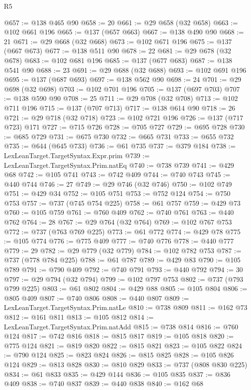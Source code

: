 \begin{lexlean}{R5}
\begin{coremodule}
{{{{{{{{{{{{{{{{{{{{{{{{{{{{{{{{{{{{{{{{{{{{{{{{{{{{{{{{{{{{{{{{{{{{{{{{{{{{{{{{{{{{@657 := @138 @465 @90
@658 := 20
@661 := @29 @658 (@32 @658)
@663 := @102 @661 @196
@665 := @137 (@657 @663)
@667 := @138 @490 @90
@668 := 21
@671 := @29 @668 (@32 @668)
@673 := @102 @671 @196
@675 := @137 (@667 @673)
@677 := @138 @511 @90
@678 := 22
@681 := @29 @678 (@32 @678)
@683 := @102 @681 @196
@685 := @137 (@677 @683)
@687 := @138 @541 @90
@688 := 23
@691 := @29 @688 (@32 @688)
@693 := @102 @691 @196
@695 := @137 (@687 @693)
@697 := @138 @562 @90
@698 := 24
@701 := @29 @698 (@32 @698)
@703 := @102 @701 @196
@705 := @137 (@697 @703)
@707 := @138 @590 @90
@708 := 25
@711 := @29 @708 (@32 @708)
@713 := @102 @711 @196
@715 := @137 (@707 @713)
@717 := @138 @614 @90
@718 := 26
@721 := @29 @718 (@32 @718)
@723 := @102 @721 @196
@726 := @137 (@717 @723) @171
@727 := @715 @726
@728 := @705 @727
@729 := @695 @728
@730 := @685 @729
@731 := @675 @730
@732 := @665 @731
@733 := @655 @732
@735 := @644 (@645 @733)
@736 := @61 @735
@737 := @379 @184
@738 := LexLeanTarget.TargetSyntax.Expr.prim
@739 := LexLeanTarget.TargetSyntax.Prim.natEq
@740 := @738 @739
@741 := @429 @68
@742 := @105 @741
@743 := @742 @409
@744 := @740 @743
@745 := @440 @744
@746 := 27
@749 := @29 @746 (@32 @746)
@750 := @102 @749
@751 := @429 @34
@752 := @105 @751
@753 := @752 @124
@754 := @750 @753
@757 := @737 (@745 @754 @225)
@758 := @61 @757
@759 := @429 @73
@760 := @105 @759
@761 := @760 @409
@762 := @740 @761
@763 := @440 @762
@764 := 28
@767 := @29 @764 (@32 @764)
@769 := @102 @767 @753
@772 := @737 (@763 @769 @225)
@773 := @61 @772
@774 := @429 @78
@775 := @105 @774
@776 := @775 @409
@777 := @740 @776
@778 := @440 @777
@779 := 29
@782 := @29 @779 (@32 @779)
@784 := @102 @782 @753
@787 := @737 (@778 @784 @225)
@788 := @61 @787
@789 := @429 @83
@790 := @105 @789
@791 := @790 @409
@792 := @740 @791
@793 := @440 @792
@794 := 30
@797 := @29 @794 (@32 @794)
@799 := @102 @797 @753
@802 := @737 (@793 @799 @225)
@803 := @61 @802
@804 := @429 @88
@805 := @105 @804
@806 := @805 @409
@807 := @740 @806
@808 := @440 @807
@809 := LexLeanTarget.TargetSyntax.Prim.natLe
@810 := @738 @809
@811 := @162 @73
@812 := @161 @811
@813 := @105 @812
@814 := LexLeanTarget.TargetSyntax.Prim.natAdd
@815 := @738 @814
@816 := @760 @124
@817 := @742 @816
@818 := @815 @817
@819 := @105 @818
@820 := @775 @124
@821 := @819 @820
@822 := @815 @821
@823 := @105 @822
@824 := @790 @124
@825 := @823 @824
@826 := @815 @825
@828 := @105 @826 @124
@829 := @813 @828
@830 := @810 @829
@833 := @737 (@808 @830 @225)
@834 := @61 @833
@835 := @429 @144
@836 := @105 @835
@837 := @836 @409
@838 := @740 @837
@839 := @440 @838
@840 := @162 @68
}}}}}}}}}}}}}}}}}}}}}}}}}}}}}}}}}}}}}}}}}}}}}}}}}}}}}}}}}}}}}}}}}}}}}}}}}}}}}}}}}}}}
\end{coremodule}
\end{lexlean}
